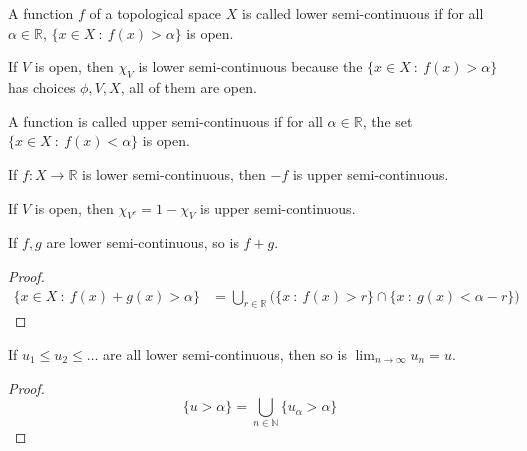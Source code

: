 
\chapter{}

\begin{definition}
  A function $f$ of a topological space $X$ is called lower
  semi-continuous if for all $\alpha \in \mathbb{R}$, $\{ x \in X
  \ : \  f(x) > \alpha \}$ is open.
\end{definition}
\begin{example}
  If $V$ is open, then $\chi_V$ is lower semi-continuous because the
  $\{ x \in X  \ : \  f(x) > \alpha \}$ has choices $ \phi, V, X$,
  all of them are open.
\end{example}

\begin{definition}
  A function is called upper semi-continuous if for all $\alpha \in
  \mathbb{R}$, the set $\{ x \in X  \ : \  f(x) < \alpha \}$ is open.
\end{definition}

\begin{remark}
  If $f: X \to \mathbb{R}$ is lower semi-continuous, then $-f$ is
  upper semi-continuous.
\end{remark}

\begin{example}
  If $V$ is open, then $\chi_{V^c} = 1- \chi_{V}$ is upper semi-continuous.
\end{example}

\begin{proposition}
  If $f, g$ are lower semi-continuous, so is $f+g$.
\end{proposition}
\begin{proof}
  \begin{align*}
    \{ x \in X  \ : \  f(x)+g(x) > \alpha \} & = \bigcup_{r \in
    \mathbb{R}} \big( \{ x \ : \  f(x) > r \}  \cap  \{ x
    \ : \  g(x)< \alpha - r \}\big)
  \end{align*}
\end{proof}

\begin{proposition}
  If $u_1 \le u_2 \le \ldots$ are all lower semi-continuous, then so
  is $\lim_{n \to \infty} u_n = u$.
\end{proposition}
\begin{proof}
  \[
    \{ u > \alpha \} = \bigcup_{n \in \mathbb{N}} \{ u_\alpha > \alpha \}
  \]
\end{proof}

